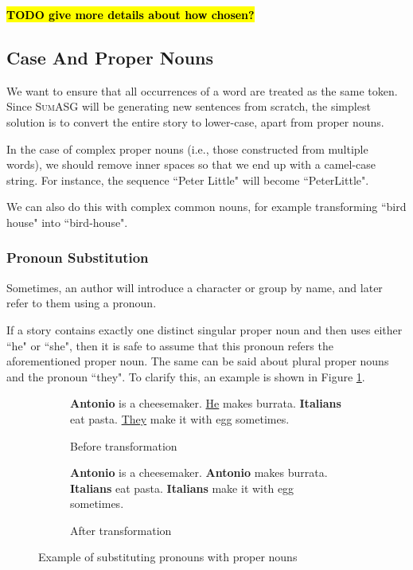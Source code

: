 \textcolor{red}{\textbf{\hl{TODO give more details about how chosen?}}}

\subsection{Case And Proper Nouns}

We want to ensure that all occurrences of a word are treated as the same token. Since \textsc{SumASG} will be generating new sentences from scratch, the simplest solution is to convert the entire story to lower-case, apart from proper nouns.

In the case of complex proper nouns (i.e., those constructed from multiple words), we should remove inner spaces so that we end up with a camel-case string. For instance, the sequence ``Peter Little" will become ``PeterLittle".

We can also do this with complex common nouns, for example transforming ``bird house" into ``bird-house".

\subsubsection{Pronoun Substitution}

Sometimes, an author will introduce a character or group by name, and later refer to them using a pronoun.

If a story contains exactly one distinct singular proper noun and then uses either ``he" or ``she", then it is safe to assume that this pronoun refers the aforementioned proper noun. The same can be said about plural proper nouns and the pronoun ``they".
To clarify this, an example is shown in Figure \ref{fig:pronoun_substitution}.

\begin{figure}[H]
\begin{subfigure}{\textwidth}
\begin{displayquote}
\textbf{Antonio} is a cheesemaker. \underline{He} makes burrata.
\textbf{Italians} eat pasta. \underline{They} make it with egg sometimes.
\end{displayquote}
\caption{Before transformation}
\vspace{\baselineskip}
\end{subfigure}
\begin{subfigure}{\textwidth}
\begin{displayquote}
\textbf{Antonio} is a cheesemaker. \textbf{Antonio} makes burrata.
\textbf{Italians} eat pasta. \textbf{Italians} make it with egg sometimes.
\caption{After transformation}
\end{displayquote}
\end{subfigure}
\caption{Example of substituting pronouns with proper nouns}
\label{fig:pronoun_substitution}
\end{figure}

